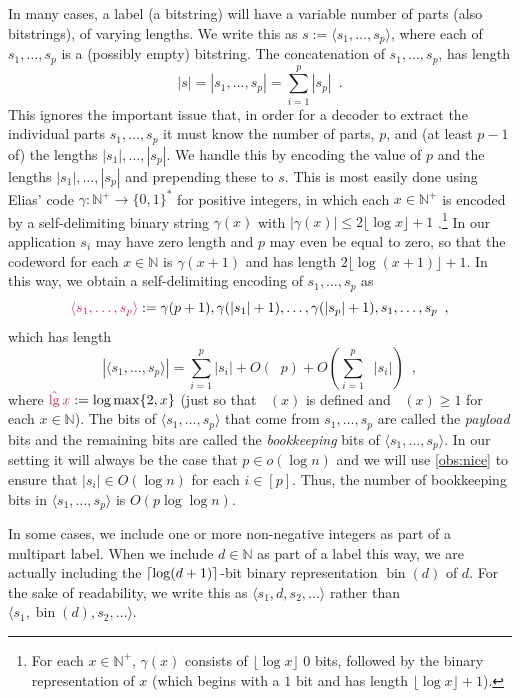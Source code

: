 \documentclass[twoside,leqno]{article}
\makeatletter
\newcommand{\N}{\mathbb{N}}
\newcommand{\floor}[1]{{\lfloor #1 \rfloor}}
\renewcommand{\ge}{\geqslant}
\renewcommand{\le}{\leqslant}
\newcommand{\defin}[1]{\emph{\textcolor{brightmaroon}{#1}}}
\def\mathcolor#1#{\@mathcolor{#1}}
\def\@mathcolor#1#2#3{%
  \protect\leavevmode
  \begingroup
    \color#1{#2}#3%
  \endgroup
}
\newcommand{\mathdefin}[1]{\mathcolor{brightmaroon}{#1}}
\DeclareMathOperator{\lgg}{\hat{lg}}
\DeclareMathOperator{\bin}{bin}
\newcommand{\Oh}{O}
\DeclarePairedDelimiter{\ceil}{\lceil}{\rceil}
\makeatother
\begin{document}
In many cases, a label (a bitstring) will have a variable number of parts (also bitstrings), of varying lengths.  We write this as $s:=\langle s_1,\ldots,s_p\rangle$, where each of $s_1,\ldots,s_p$ is a (possibly empty) bitstring.  The concatenation of $s_1,\ldots,s_p$, has length
\[
  \textstyle |s|=|s_1,\ldots,s_p|=\sum_{i=1}^p|s_p| \enspace .
\]
This ignores the important issue that, in order for a decoder to extract the individual parts $s_1,\ldots,s_p$ it must know the number of parts, $p$, and (at least $p-1$ of) the lengths $|s_1|,\ldots,|s_p|$.  We handle this by encoding the value of $p$ and the lengths $|s_1|,\ldots,|s_{p}|$ and prepending these to $s$. This is most easily done using Elias' code $\gamma:\N^+\to\{0,1\}^*$ for positive integers, in which each $x\in\N^+$ is encoded by a self-delimiting binary string $\gamma(x)$ with $|\gamma(x)|\le 2\lfloor \log x  \rfloor  + 1$ \cite{elias:universal}.\footnote{For each $x\in\N^+$, $\gamma(x)$ consists of $\lfloor\log x\rfloor$ 0 bits, followed by the binary representation of $x$ (which begins with a $1$ bit and has length $\lfloor\log x\rfloor+1$).} In our application $s_i$ may have zero length and $p$ may even be equal to zero, so that the codeword for each $x\in\N$ is $\gamma(x+1)$ and has length $2\floor{\log (x+1)}+1$.
In this way, we obtain a self-delimiting encoding of $s_1,\ldots,s_p$ as
\[  \mathdefin{\langle s_1,\ldots,s_p\rangle}:=\gamma(p+1),\gamma(|s_1|+1),\ldots,\gamma(|s_p|+1),s_1,\ldots,s_p \enspace ,
\]
which has length
\begin{equation}
  |\langle s_1,\ldots,s_p\rangle| = \textstyle\sum_{i=1}^p|s_i|+\Oh(\lgg p) + \Oh(\sum_{i=1}^p\lgg|s_i|) \enspace , \label{encoding_cost}
\end{equation}
where $\mathdefin{\lgg x} := \log\max\{2,x\}$ (just so that $\lgg(x)$ is defined and $\lgg(x)\ge 1$ for each $x\in\N$).    The bits of $\langle s_1,\ldots,s_p\rangle$ that come from $s_1,\ldots,s_p$ are called the \defin{payload} bits and the remaining bits are called the \defin{bookkeeping} bits of $\langle s_1,\ldots,s_p\rangle$.
In our setting it will always be the case that $p\in o(\log n)$ and we will use \cref{obs:nice} to ensure that $|s_i|\in \Oh(\log n)$ for each $i\in[p]$.
Thus, the number of bookkeeping bits in $\langle s_1,\ldots,s_p\rangle$  is $\Oh(p\log\log n)$.

In some cases, we include one or more non-negative integers as part of a multipart label.  When we include $d\in\N$ as part of a label this way, we are actually including the $\ceil{\log(d+1)}$-bit binary representation \defin{$\bin(d)$} of $d$.  For the sake of readability, we write this as $\langle s_1,d,s_2,\ldots\rangle$ rather than $\langle s_1,\bin(d),s_2,\ldots\rangle$. \label{bin_d}
\end{document}

